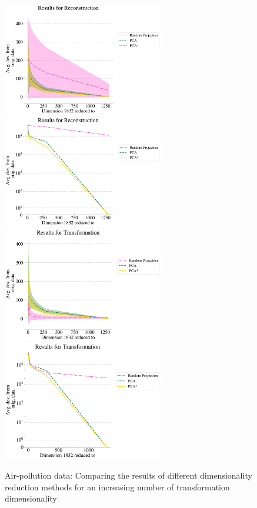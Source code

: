 \documentclass[pdftex,12pt,a4paper]{report}
\begin{document}
\begin{figure}
    \includegraphics[width=7cm]{./images/real-world/air_pollution/avg_dev_vs_dyn_low/reconstructed_1lines_4380points_euclidean.pdf}
    \includegraphics[width=7cm]{./images/real-world/air_pollution/avg_dev_vs_dyn_low/reconstructed_1lines_4380points_multiple_scalar_product.pdf}
    \includegraphics[width=7cm]{./images/real-world/air_pollution/avg_dev_vs_dyn_low/transformed_1lines_4380points_euclidean.pdf}
    \includegraphics[width=7cm]{./images/real-world/air_pollution/avg_dev_vs_dyn_low/transformed_1lines_4380points_multiple_scalar_product.pdf}
    \caption{Air-pollution data: Comparing the results of different dimensionality reduction methods for an increasing number of transformation dimensionality}\label{fig:avg_dev_vs_low_dim-air}
\end{figure}
\end{document}
